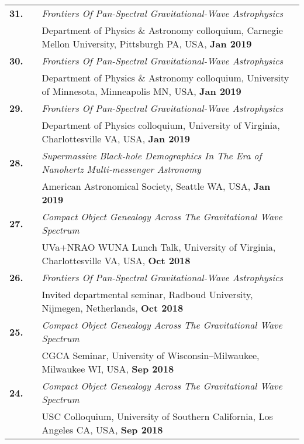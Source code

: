 \documentclass[11pt,letterpaper,sans]{moderncv}
\begin{document}
{\begin{longtable}{rp{0.3cm}p{15.8cm}}
\textbf{31.} & & \textit{Frontiers Of Pan-Spectral Gravitational-Wave Astrophysics} \\
&& Department of Physics \& Astronomy colloquium, Carnegie Mellon University, Pittsburgh PA, USA, \textbf{Jan 2019} \vspace{0.09cm}\\
\textbf{30.} & & \textit{Frontiers Of Pan-Spectral Gravitational-Wave Astrophysics} \\
&& Department of Physics \& Astronomy colloquium, University of Minnesota, Minneapolis MN, USA, \textbf{Jan 2019} \vspace{0.09cm}\\
\textbf{29.} & & \textit{Frontiers Of Pan-Spectral Gravitational-Wave Astrophysics} \\
&& Department of Physics colloquium, University of Virginia, Charlottesville VA, USA, \textbf{Jan 2019} \vspace{0.09cm}\\
\textbf{28.} & & \textit{Supermassive Black-hole Demographics In The Era of Nanohertz Multi-messenger Astronomy} \\
&& American Astronomical Society, Seattle WA, USA, \textbf{Jan 2019} \vspace{0.09cm}\\
\textbf{27.} & & \textit{Compact Object Genealogy Across The Gravitational Wave Spectrum} \\
&& UVa+NRAO WUNA Lunch Talk, University of Virginia, Charlottesville VA, USA, \textbf{Oct 2018} \vspace{0.09cm}\\
\textbf{26.} & & \textit{Frontiers Of Pan-Spectral Gravitational-Wave Astrophysics} \\
&& Invited departmental seminar, Radboud University, Nijmegen, Netherlands, \textbf{Oct 2018} \vspace{0.09cm}\\
\textbf{25.} & & \textit{Compact Object Genealogy Across The Gravitational Wave Spectrum} \\
&& CGCA Seminar, University of Wisconsin--Milwaukee, Milwaukee WI, USA, \textbf{Sep 2018} \vspace{0.09cm}\\
\textbf{24.} & & \textit{Compact Object Genealogy Across The Gravitational Wave Spectrum} \\
&& USC Colloquium, University of Southern California, Los Angeles CA, USA, \textbf{Sep 2018} \vspace{0.09cm}\\

\end{longtable}}
\end{document}

